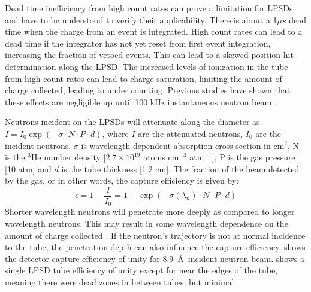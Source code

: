 Dead time inefficiency from high count rates can prove a limitation for LPSDs and have to be understood to verify their applicability. There is about a 1$\mu s$ dead time when the charge from an event is integrated. High count rates can lead to a dead time if the integrator has not yet reset from first event integration, increasing the fraction of vetoed events. This can lead to a skewed position hit determination along the LPSD. The increased levels of ionization in the tube from high count rates can lead to charge saturation, limiting the amount of charge collected, leading to under counting. Previous studies have shown that these effects are negligible up until 100 kHz instantaneous neutron beam \cite{Diawara2023}.

Neutrons incident on the LPSDs will attenuate along the diameter as $ I = I_0 \exp(-\sigma \cdot N \cdot P \cdot d) $, where $I$ are the attenuated neutrons, $I_0$ are the incident neutrons, $\sigma$ is wavelength dependent absorption cross section in cm$^2$, N is the $^3$He number density [$2.7 \times 10^{19}$ atoms cm$^{-3}$ atm$^{-1}$], P is the gas pressure [10 atm] and $d$ is the tube thickness [1.2 cm]. The fraction of the beam detected by the gas, or in other words, the capture efficiency is given by:
\begin{equation}
    \epsilon = 1 - \frac{I}{I_0} = 1 - \exp \left( - \sigma(\lambda_n) \cdot N \cdot P \cdot d \right)
\end{equation}
Shorter wavelength neutrons will penetrate more deeply as compared to longer wavelength neutrons. This may result in some wavelength dependence on the amount of charge collected \cite{Diawara2023}. If the neutron’s trajectory is not at normal incidence to the tube, the penetration depth can also influence the capture efficiency.  shows the detector capture efficiency of unity for 8.9~\AA\ incident neutron beam.  shows a single LPSD tube efficiency of unity except for near the edges of the tube, meaning there were dead zones in between tubes, but minimal.

